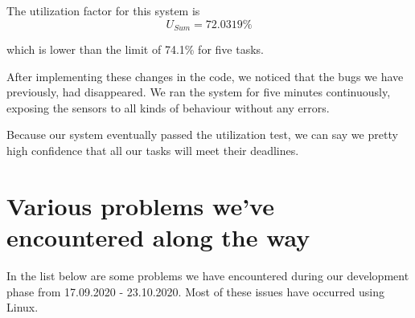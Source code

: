 \documentclass{article}
\begin{document}
The utilization factor for this system is
\begin{equation*}
  U_{Sum} = 72.0319\%
\end{equation*}

which is lower than the limit of 74.1\% for five tasks.

After implementing these changes in the code, we noticed that the bugs we have previously, had disappeared. We ran the system for five minutes continuously, exposing the sensors to all kinds of behaviour without any errors.

Because our system eventually passed the utilization test, we can say we pretty high confidence that all our tasks will meet their deadlines.


\section{Various problems we've encountered along the way}
In the list below are some problems we have encountered during our development phase from 17.09.2020 - 23.10.2020. Most of these issues have occurred using Linux.
\end{document}
